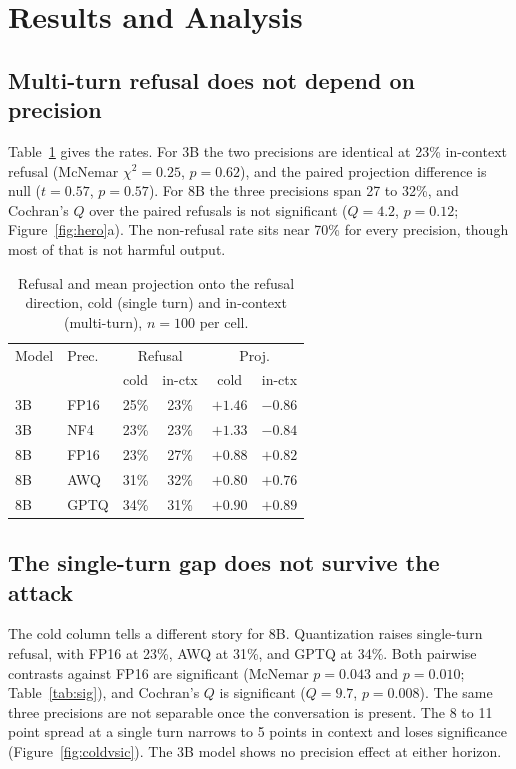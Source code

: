 \documentclass[10pt,twocolumn,letterpaper]{article}
\begin{document}
\section{Results and Analysis}
\subsection{Multi-turn refusal does not depend on precision}
Table~\ref{tab:means} gives the rates. For 3B the two precisions are identical at
23\% in-context refusal (McNemar $\chi^2=0.25$, $p=0.62$), and the paired
projection difference is null ($t=0.57$, $p=0.57$). For 8B the three precisions
span 27 to 32\%, and Cochran's $Q$ over the paired refusals is not significant
($Q=4.2$, $p=0.12$; Figure~\ref{fig:hero}a). The non-refusal rate sits near 70\%
for every precision, though most of that is not harmful output.

\begin{table}[t]
\centering\small
\begin{tabular}{llcccc}
\toprule
Model & Prec. & \multicolumn{2}{c}{Refusal} & \multicolumn{2}{c}{Proj.} \\
& & cold & in-ctx & cold & in-ctx \\
\midrule
3B & FP16 & 25\% & 23\% & $+1.46$ & $-0.86$ \\
3B & NF4  & 23\% & 23\% & $+1.33$ & $-0.84$ \\
\midrule
8B & FP16 & 23\% & 27\% & $+0.88$ & $+0.82$ \\
8B & AWQ  & 31\% & 32\% & $+0.80$ & $+0.76$ \\
8B & GPTQ & 34\% & 31\% & $+0.90$ & $+0.89$ \\
\bottomrule
\end{tabular}
\caption{Refusal and mean projection onto the refusal direction, cold (single
turn) and in-context (multi-turn), $n=100$ per cell.}
\label{tab:means}
\end{table}

\subsection{The single-turn gap does not survive the attack}
The cold column tells a different story for 8B. Quantization raises single-turn
refusal, with FP16 at 23\%, AWQ at 31\%, and GPTQ at 34\%. Both pairwise contrasts
against FP16 are significant (McNemar $p=0.043$ and $p=0.010$; Table~\ref{tab:sig}),
and Cochran's $Q$ is significant ($Q=9.7$, $p=0.008$). The same three precisions
are not separable once the conversation is present. The 8 to 11 point spread at a
single turn narrows to 5 points in context and loses significance
(Figure~\ref{fig:coldvsic}). The 3B model shows no precision effect at either
horizon.
\end{document}
